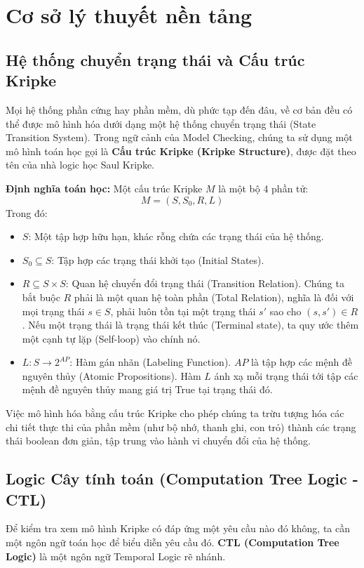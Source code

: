 \documentclass[12pt,a4paper]{article}
\begin{document}
\newpage
\section{Cơ sở lý thuyết nền tảng}

\subsection{Hệ thống chuyển trạng thái và Cấu trúc Kripke}
Mọi hệ thống phần cứng hay phần mềm, dù phức tạp đến đâu, về cơ bản đều có thể được mô hình hóa dưới dạng một hệ thống chuyển trạng thái (State Transition System). Trong ngữ cảnh của Model Checking, chúng ta sử dụng một mô hình toán học gọi là \textbf{Cấu trúc Kripke (Kripke Structure)}, được đặt theo tên của nhà logic học Saul Kripke.

\textbf{Định nghĩa toán học:} Một cấu trúc Kripke $M$ là một bộ 4 phần tử: 
\begin{equation}
M = (S, S_0, R, L)
\end{equation}
Trong đó:
\begin{itemize}
    \item $S$: Một tập hợp hữu hạn, khác rỗng chứa các trạng thái của hệ thống.
    \item $S_0 \subseteq S$: Tập hợp các trạng thái khởi tạo (Initial States).
    \item $R \subseteq S \times S$: Quan hệ chuyển đổi trạng thái (Transition Relation). Chúng ta bắt buộc $R$ phải là một quan hệ toàn phần (Total Relation), nghĩa là đối với mọi trạng thái $s \in S$, phải luôn tồn tại một trạng thái $s'$ sao cho $(s, s') \in R$. Nếu một trạng thái là trạng thái kết thúc (Terminal state), ta quy ước thêm một cạnh tự lặp (Self-loop) vào chính nó.
    \item $L: S \rightarrow 2^{AP}$: Hàm gán nhãn (Labeling Function). $AP$ là tập hợp các mệnh đề nguyên thủy (Atomic Propositions). Hàm $L$ ánh xạ mỗi trạng thái tới tập các mệnh đề nguyên thủy mang giá trị True tại trạng thái đó.
\end{itemize}

Việc mô hình hóa bằng cấu trúc Kripke cho phép chúng ta trừu tượng hóa các chi tiết thực thi của phần mềm (như bộ nhớ, thanh ghi, con trỏ) thành các trạng thái boolean đơn giản, tập trung vào hành vi chuyển đổi của hệ thống.

\subsection{Logic Cây tính toán (Computation Tree Logic - CTL)}
Để kiểm tra xem mô hình Kripke có đáp ứng một yêu cầu nào đó không, ta cần một ngôn ngữ toán học để biểu diễn yêu cầu đó. \textbf{CTL (Computation Tree Logic)} là một ngôn ngữ Temporal Logic rẽ nhánh.
\end{document}

